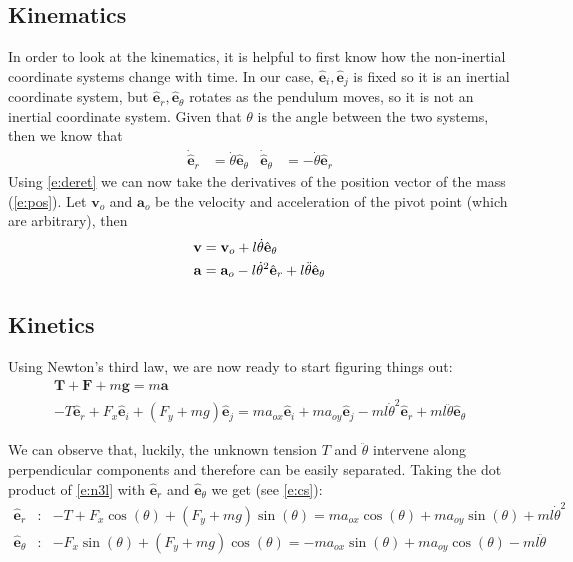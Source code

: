 \documentclass{article}
\newcommand{\vct}{\mathbf}     %
\newcommand{\uvc}[1]{\hat{\mathbf{#1}}} %
\newcommand{\er}{\uvc{e}_r}      %
\newcommand{\et}{\uvc{e}_\theta} %
\newcommand{\Der}{\dot{\uvc{e}}_r}      %
\newcommand{\Det}{\dot{\uvc{e}}_\theta} %
\newcommand{\ei}{\uvc{e}_i}      %
\newcommand{\ej}{\uvc{e}_j}      %
\newcommand{\nf}{F}              %
\newcommand{\vf}{\vct{\nf}}      %
\newcommand{\nt}{T}              %
\newcommand{\vt}{\vct{\nt}}      %
\newcommand{\vg}{\vct{g}}        %
\newcommand{\vo}{\vct{v}_{o}}    %
\newcommand{\ao}{\vct{a}_{o}}    %
\newcommand{\aox}{a_{ox}}        %
\newcommand{\aoy}{a_{oy}}        %
\newcommand{\vv}{\vct{v}}        %
\newcommand{\va}{\vct{a}}        %
\begin{document}
\subsection{Kinematics}
In order to look at the kinematics, it is helpful to first know how the non-inertial coordinate systems change with time. In our case, ${\ei,\ej}$ is fixed so it is an inertial coordinate system, but ${\er,\et}$ rotates as the pendulum moves, so it is not an inertial coordinate system. Given that $\theta$ is the angle between the two systems, then we know that
\begin{align}
  \Der&=\dot{\theta}\et & \Det&=-\dot{\theta}\er
  \label{e:deret}
\end{align}
Using \cref{e:deret} we can now take the derivatives of the position vector of the mass (\cref{e:pos}). Let $\vo$ and $\ao$ be the velocity and acceleration of the pivot point (which are arbitrary), then
\begin{align}
  \vv&=\vo+l\dot\theta\et \notag\\
  \va&=\ao-l{\dot\theta}^2\er+l\ddot\theta\et
\end{align}

\subsection{Kinetics}
Using Newton's third law, we are now ready to start figuring things out:
\begin{gather}
  \vt+\vf+m\vg = m\va \label{e:n3lntsp}\\
  -T\er+\nf_x\ei+\left(\nf_y+mg\right)\ej=m\aox\ei+m\aoy\ej-ml{\dot\theta}^2\er+ml\ddot\theta\et \label{e:n3l}
\end{gather}

We can observe that, luckily, the unknown tension $\nt$ and $\ddot{\theta}$ intervene along perpendicular components and therefore can be easily separated. Taking the dot product of \cref{e:n3l} with $\er$ and $\et$ we get (see \cref{e:cs}):
\begin{equation}
  \begin{aligned}
    \er&:&-\nt+\nf_x\cos(\theta)+\left(\nf_y+mg\right)\sin(\theta)=
    m\aox\cos(\theta)+m\aoy\sin(\theta)+ml{\dot\theta}^2 \\
    \et&:&-\nf_x\sin(\theta)+\left(\nf_y+mg\right)\cos(\theta)=
    -m\aox\sin(\theta)+m\aoy\cos(\theta)-ml\ddot\theta 
  \end{aligned}
  \label{e:n3lrt}
\end{equation}
\end{document}
